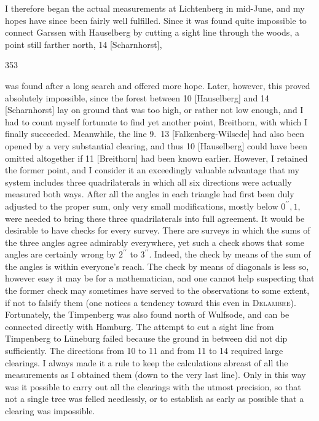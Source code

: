 I therefore began the actual measurements at Lichtenberg in mid-June, and my hopes have since been fairly well fulfilled.
Since it was found quite impossible to connect Garssen with Hauselberg by cutting a sight line through the woods, a point still farther north, 14 [Scharnhorst],
\par\clearpage
{}\hfill353\par\medskip
\noindent was found after a long search and offered more hope.
Later, however, this proved absolutely impossible, since the forest between 10 [Hauselberg] and 14 [Scharnhorst] lay on ground that was too high, or rather not low enough, and I had to count myself fortunate to find yet another point, Breithorn, with which I finally succeeded.
Meanwhile, the line 9.~13 [Falkenberg-Wilsede] had also been opened by a very substantial clearing, and thus 10 [Hauselberg] could have been omitted altogether if 11 [Breithorn] had been known earlier.
However, I retained the former point, and I consider it an exceedingly valuable advantage that my system includes three quadrilaterals in which all six directions were actually measured both ways.
After all the angles in each triangle had first been duly adjusted to the proper sum, only very small modifications, mostly below \(0^{\prime\prime}{,}1\), were needed to bring these three quadrilaterals into full agreement.
It would be desirable to have  checks for every survey.
There are surveys in which the sums of the three angles agree admirably everywhere, yet such a check shows that some angles are certainly wrong by \(2^{\prime\prime}\) to \(3^{\prime\prime}\).
Indeed, the check by means of the sum of the angles is within everyone's reach. The check by means of diagonals is less so, however easy it may be for a mathematician, and one cannot help suspecting that the former check may sometimes have served to  the observations to some extent, if not to falsify them (one notices a tendency toward this even in \textsc{Delambre}).
Fortunately, the Timpenberg was also found north of Wulfsode, and can be connected directly with Hamburg. The attempt to cut a sight line from Timpenberg to Lüneburg failed because the ground in between did not dip sufficiently.
The directions from 10 to 11 and from 11 to 14 required large clearings.
I always made it a rule to keep the calculations abreast of all the measurements as I obtained them (down to the very last line). Only in this way was it possible to carry out all the clearings with the utmost precision, so that not a single tree was felled needlessly, or to establish as early as possible that a clearing was impossible.
